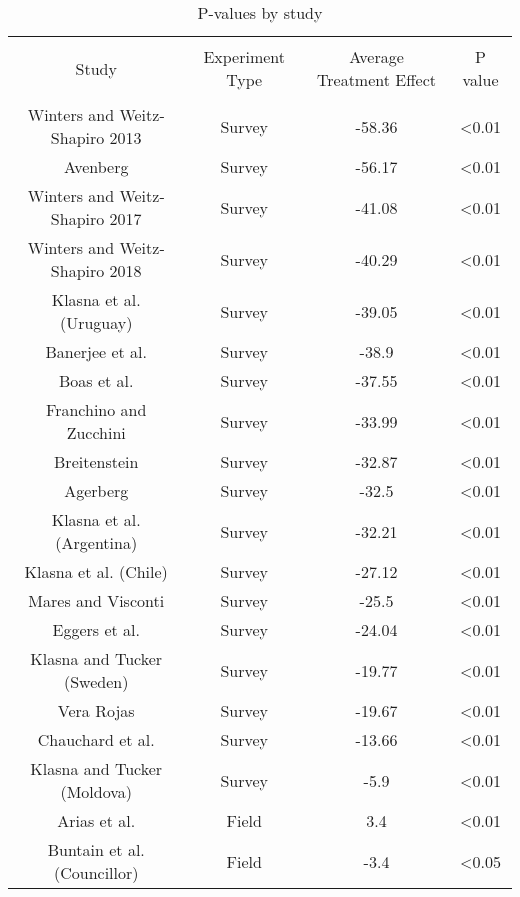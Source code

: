 
\begin{table}[!htbp] \centering 
  \caption{P-values by study} 
  \label{p_study} 
\begin{tabular}{@{\extracolsep{5pt}} cccc} 
\\[-1.8ex]\hline 
\hline \\[-1.8ex] 
Study & Experiment Type & Average Treatment Effect & P value \\ 
\hline \\[-1.8ex] 
Winters and Weitz-Shapiro 2013 & Survey & -58.36 & \textless 0.01 \\ 
Avenberg & Survey & -56.17 & \textless 0.01 \\ 
Winters and Weitz-Shapiro 2017 & Survey & -41.08 & \textless 0.01 \\ 
Winters and Weitz-Shapiro 2018 & Survey & -40.29 & \textless 0.01 \\ 
Klasna et al. (Uruguay) & Survey & -39.05 & \textless 0.01 \\ 
Banerjee et al. & Survey & -38.9 & \textless 0.01 \\ 
Boas et al. & Survey & -37.55 & \textless 0.01 \\ 
Franchino and Zucchini & Survey & -33.99 & \textless 0.01 \\ 
Breitenstein & Survey & -32.87 & \textless 0.01 \\ 
Agerberg & Survey & -32.5 & \textless 0.01 \\ 
Klasna et al. (Argentina) & Survey & -32.21 & \textless 0.01 \\ 
Klasna et al. (Chile) & Survey & -27.12 & \textless 0.01 \\ 
Mares and Visconti & Survey & -25.5 & \textless 0.01 \\ 
Eggers et al. & Survey & -24.04 & \textless 0.01 \\ 
Klasna and Tucker (Sweden) & Survey & -19.77 & \textless 0.01 \\ 
Vera Rojas & Survey & -19.67 & \textless 0.01 \\ 
Chauchard et al. & Survey & -13.66 & \textless 0.01 \\ 
Klasna and Tucker (Moldova) & Survey & -5.9 & \textless 0.01 \\ 
Arias et al. & Field & 3.4 & \textless 0.01 \\ 
Buntain et al. (Councillor) & Field & -3.4 & \textless 0.05 \\ 

\end{tabular}
\end{table}
